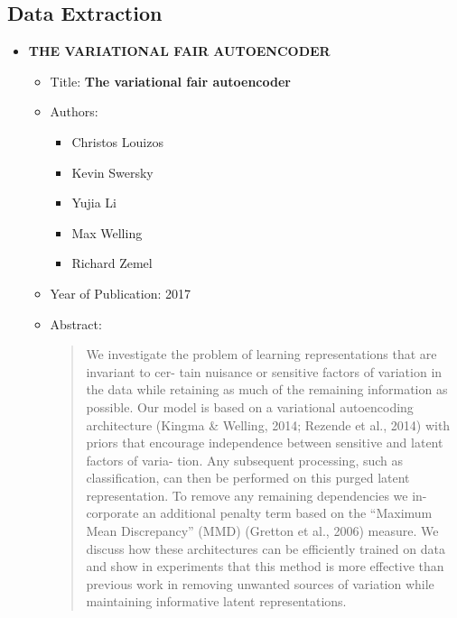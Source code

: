 \documentclass{article}
\begin{document}
    \subsection{Data Extraction}
    \begin{itemize}
        \item \textbf{THE VARIATIONAL FAIR AUTOENCODER}
        \begin{itemize}
            \item Title: \textbf{The variational fair autoencoder}
            \item Authors: 
            \begin{itemize}
                \item Christos Louizos
                \item Kevin Swersky
                \item Yujia Li
                \item Max Welling
                \item Richard Zemel
            \end{itemize}
            \item Year of Publication: 2017
            \item Abstract:
            \begin{abstract}
                We investigate the problem of learning representations that are invariant to cer-
                tain nuisance or sensitive factors of variation in the data while retaining as much
                of the remaining information as possible. Our model is based on a variational
                autoencoding architecture (Kingma \& Welling, 2014; Rezende et al., 2014) with
                priors that encourage independence between sensitive and latent factors of varia-
                tion. Any subsequent processing, such as classification, can then be performed on
                this purged latent representation. To remove any remaining dependencies we in-
                corporate an additional penalty term based on the “Maximum Mean Discrepancy”
                (MMD) (Gretton et al., 2006) measure. We discuss how these architectures can
                be efficiently trained on data and show in experiments that this method is more
                effective than previous work in removing unwanted sources of variation while
                maintaining informative latent representations.
            \end{abstract}
        \end{itemize}
        

\end{itemize}
\end{document}
